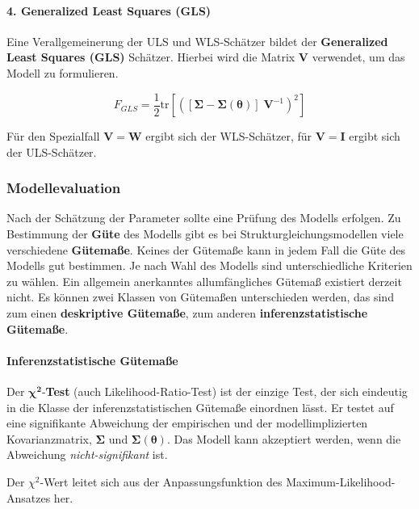 \documentclass{article}
\numberwithin{equation}{section}
\begin{document}
\paragraph*{4. Generalized Least Squares (GLS)}

Eine Verallgemeinerung der ULS und WLS-Schätzer bildet der \textbf{Generalized Least Squares (GLS)} Schätzer. Hierbei wird die Matrix $\mathbf{V}$ verwendet, um das Modell zu formulieren.

\begin{equation}
F_{GLS} = \frac{1}{2} \text{tr} \left[ \left( [\boldsymbol\Sigma - \boldsymbol\Sigma (\boldsymbol\theta)] \; \mathbf{V}^{-1} \right)^2 \right]
\end{equation}

Für den Spezialfall $\mathbf{V} = \mathbf{W}$ ergibt sich der WLS-Schätzer, für $\mathbf{V} = \mathbf{I}$ ergibt sich der ULS-Schätzer.

\subsubsection{Modellevaluation}

Nach der Schätzung der Parameter sollte eine Prüfung des Modells erfolgen. Zu Bestimmung der \textbf{Güte} des Modells gibt es bei Strukturgleichungsmodellen viele verschiedene \textbf{Gütemaße}. Keines der Gütemaße kann in jedem Fall die Güte des Modells gut bestimmen. Je nach Wahl des Modells sind unterschiedliche Kriterien zu wählen. Ein allgemein anerkanntes allumfängliches Gütemaß existiert derzeit nicht. Es können zwei Klassen von Gütemaßen unterschieden werden, das sind zum einen \textbf{deskriptive Gütemaße}, zum anderen \textbf{inferenzstatistische Gütemaße}.

\paragraph*{Inferenzstatistische Gütemaße}

Der $\mathbf{\boldsymbol\chi^2}$-\textbf{Test} (auch Likelihood-Ratio-Test) ist der einzige Test, der sich eindeutig in die Klasse der inferenzstatistischen Gütemaße einordnen lässt. Er testet auf eine signifikante Abweichung der empirischen und der modellimplizierten Kovarianzmatrix, $\boldsymbol\Sigma$ und $\boldsymbol\Sigma (\boldsymbol\theta)$. Das Modell kann akzeptiert werden, wenn die Abweichung \emph{nicht-signifikant} ist.

Der $\chi^2$-Wert leitet sich aus der Anpassungsfunktion des Maximum-Likelihood-Ansatzes her.
\end{document}
